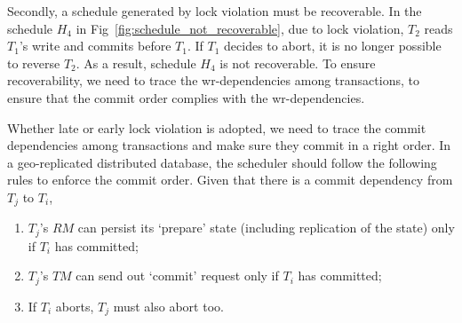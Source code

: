 \documentclass[conference]{IEEEtran}
\begin{document}


Secondly, a schedule generated by lock violation must be recoverable.
In the schedule ${H_4}$ in Fig~\ref{fig:schedule_not_recoverable}, due to lock violation,
${T_2}$ reads  ${T_1}$'s write and commits before ${T_1}$.
If ${T_1}$ decides to abort, it is no longer possible to reverse ${T_2}$.
As a result, schedule ${H_4}$ is not recoverable.
To ensure recoverability, we need to trace the wr-dependencies among transactions, to ensure that the commit order complies with the wr-dependencies.






Whether late or early lock violation is adopted, we need to trace the commit dependencies among transactions and make sure they commit in a right order.
In a geo-replicated distributed database, the scheduler should follow the following rules to enforce the commit order.
Given that there is a commit dependency from ${T_j}$ to ${T_i}$,
\begin{enumerate}
  \item ${T_j}$'s $RM$ can persist its `prepare' state (including replication of the state) only if ${T_i}$ has committed;
  \label{rule:prepare}

  \item ${T_j}$'s $TM$ can send out `commit' request only if ${T_i}$ has committed;
  \label{rule:commit}

  \item If ${T_i}$ aborts, ${T_j}$ must also abort too.
  \label{rule:abort}
\end{enumerate}
\end{document}

